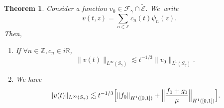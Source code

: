 \documentclass[JEP,XML,SOM,Unicode,NoFloatCountersInSection,published]{cedram}
\newtheorem{theorem}{Theorem}[section]
\theoremstyle{definition}
\newcommand\R{\mathbb R}
\newcommand\Z{\mathbb Z}
\newcommand\ET{\widetilde{\mathcal{E}}}
\newcommand{\Bpac}[1]{\Bigl[#1\Bigr]}
\newcommand{\absabs}[1]{\left\|#1\right\|}
\newcommand{\Babsabs}[1]{\Bigl\|#1\Bigr\|}
\begin{document}
\begin{theorem}\label{decay_linf}
Consider a function $v_0 \in \mathcal{F}_\gamma \cap \ET$. We~write
\[
v(t,z) = \sum_{n\in\Z} c_n(t) \psi_n(z). 
\]
Then,
\begin{enumerate}
\item\label{decay_linfi} If $\forall n\in \Z, c_n \in i\R$,\vspace*{-3pt}
\[
\|v(t)\|_{L^\infty(S_\gamma)} \lesssim {t^{-1/3}} \|v_0\|_{L^1(S_\gamma)}.
\]
\item\label{decay_linfii} We have\vspace*{-3pt}
\begin{equation*}
\|v(t)\|_{L^\infty(S_\gamma)}
\lesssim {t^{-1/3}} \Bpac{\absabs{{f}_0}_{H^1([0,1])}+ \Babsabs{\frac{{f}_0+{g}_0}{\mu} }_{H^1([0,1])}}.
\end{equation*}
\end{enumerate}
\end{theorem}
\end{document}
